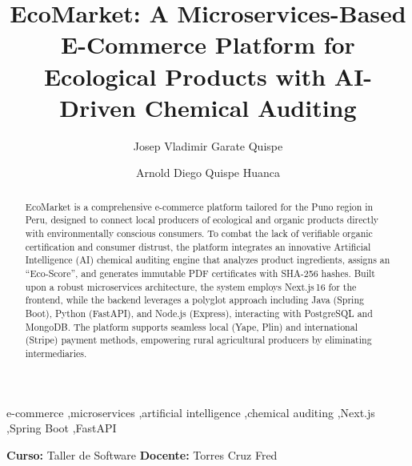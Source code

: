\documentclass[preprint,12pt,a4paper]{elsarticle}
\begin{document}
\renewcommand{\labelenumii}{\arabic{enumi}.\arabic{enumii}}

\begin{frontmatter}

\title{EcoMarket: A Microservices-Based E-Commerce Platform for Ecological Products with AI-Driven Chemical Auditing}

\author[unal]{Josep Vladimir Garate Quispe}

\author[unal]{Arnold Diego Quispe Huanca}


\address[unal]{Escuela Profesional de Ingeniería de Sistemas,
               Facultad de Ingeniería de Sistemas,
               Universidad Nacional del Altiplano,
               Puno, Peru}

\begin{abstract}
EcoMarket is a comprehensive e-commerce platform tailored for the Puno region in Peru, designed to connect local producers of ecological and organic products directly with environmentally conscious consumers. To combat the lack of verifiable organic certification and consumer distrust, the platform integrates an innovative Artificial Intelligence (AI) chemical auditing engine that analyzes product ingredients, assigns an ``Eco-Score'', and generates immutable PDF certificates with SHA-256 hashes. Built upon a robust microservices architecture, the system employs Next.js\,16 for the frontend, while the backend leverages a polyglot approach including Java (Spring Boot), Python (FastAPI), and Node.js (Express), interacting with PostgreSQL and MongoDB. The platform supports seamless local (Yape, Plin) and international (Stripe) payment methods, empowering rural agricultural producers by eliminating intermediaries.
\end{abstract}

\begin{keyword}
e-commerce \sep microservices \sep artificial intelligence \sep chemical auditing \sep Next.js \sep Spring Boot \sep FastAPI
\end{keyword}

\end{frontmatter}

\noindent\textbf{Curso:} Taller de Software \hfill \textbf{Docente:} Torres Cruz Fred
\end{document}
